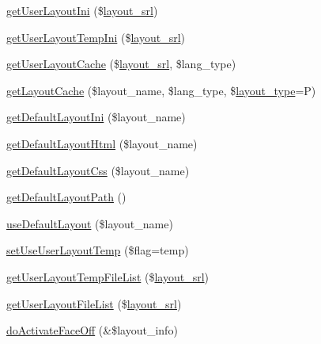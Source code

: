 \begin{DoxyCompactItemize}
\item 
\hyperlink{classlayoutModel_ae52b6a4a0f82631f23b6af7603c0a30e}{get\+User\+Layout\+Ini} (\$\hyperlink{ko_8install_8php_a70054876db09b2519a1726663c8dd9e7}{layout\+\_\+srl})
\item 
\hyperlink{classlayoutModel_a0de830b5db7303b6909568dfdfad2ac3}{get\+User\+Layout\+Temp\+Ini} (\$\hyperlink{ko_8install_8php_a70054876db09b2519a1726663c8dd9e7}{layout\+\_\+srl})
\item 
\hyperlink{classlayoutModel_a54bdf5ad29661e7d2e97e4831cf8832c}{get\+User\+Layout\+Cache} (\$\hyperlink{ko_8install_8php_a70054876db09b2519a1726663c8dd9e7}{layout\+\_\+srl}, \$lang\+\_\+type)
\item 
\hyperlink{classlayoutModel_afdd4cdf78d44f0a042522112818ddf11}{get\+Layout\+Cache} (\$layout\+\_\+name, \$lang\+\_\+type, \$\hyperlink{ko_8install_8php_a0532d89570cfdaebc628afac2ff5a81b}{layout\+\_\+type}=\textquotesingle{}P\textquotesingle{})
\item 
\hyperlink{classlayoutModel_a983d5b4ff865d15ee237385b1c82b5e5}{get\+Default\+Layout\+Ini} (\$layout\+\_\+name)
\item 
\hyperlink{classlayoutModel_a1ec8ba060697878271fc70fbc0ce2867}{get\+Default\+Layout\+Html} (\$layout\+\_\+name)
\item 
\hyperlink{classlayoutModel_a986cf32677527f2efeacb8e5c2bc68e6}{get\+Default\+Layout\+Css} (\$layout\+\_\+name)
\item 
\hyperlink{classlayoutModel_a446c397aaf30fa592cba675f2fbb9495}{get\+Default\+Layout\+Path} ()
\item 
\hyperlink{classlayoutModel_a85dfbba773c086806d4d8c9586d16e52}{use\+Default\+Layout} (\$layout\+\_\+name)
\item 
\hyperlink{classlayoutModel_a513d5dde919e55e29c25889729d087a1}{set\+Use\+User\+Layout\+Temp} (\$flag=\textquotesingle{}temp\textquotesingle{})
\item 
\hyperlink{classlayoutModel_a64f8b7f26a864b7c64d491a83bbf3961}{get\+User\+Layout\+Temp\+File\+List} (\$\hyperlink{ko_8install_8php_a70054876db09b2519a1726663c8dd9e7}{layout\+\_\+srl})
\item 
\hyperlink{classlayoutModel_a068c761aeebdbc423b005a2e793b1b21}{get\+User\+Layout\+File\+List} (\$\hyperlink{ko_8install_8php_a70054876db09b2519a1726663c8dd9e7}{layout\+\_\+srl})
\item 
\hyperlink{classlayoutModel_a09e314ac34d65617cbfd2f1aa5f097a8}{do\+Activate\+Face\+Off} (\&\$layout\+\_\+info)
\end{DoxyCompactItemize}
